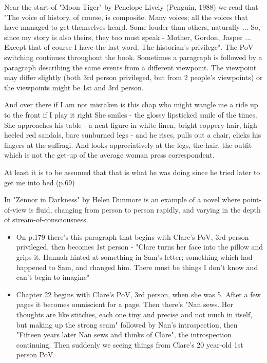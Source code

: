 \documentclass[11pt]{article}
\newenvironment{narrow}[2]{%
 \begin{list}{}{%
  \setlength{\topsep}{0pt}%
  \setlength{\leftmargin}{#1}%
  \setlength{\rightmargin}{#2}%
  \setlength{\listparindent}{\parindent}%
  \setlength{\itemindent}{\parindent}%
  \setlength{\parsep}{\parskip}%
 }%
\item[]}{\end{list}}
\begin{document}
Near the start of "Moon Tiger" by Penelope Lively (Penguin, 1988) we read that "The voice of history, of course, is composite. Many voices; all the voices that have managed to get themselves heard. Some louder than others, naturally ... So, since my story is also theirs, they too must speak - Mother, Gordon, Jasper ... Except that of course I have the last word. The historian's privilege". The PoV-switching continues throughout the book. Sometimes a paragraph is followed by a paragraph describing the same events from a different viewpoint. The viewpoint may differ slightly (both 3rd person privileged, but from 2 people's viewpoints) or the viewpoints might be 1st and 3rd person.
\begin{narrow}{1.0cm}{1.0cm}  
And over there if I am not mistaken is this chap who might wangle me a
 ride up to the front if I play it right She smiles - the glossy
 lipsticked smile of the times. She approaches his table - a neat
 figure in white linen, bright coppery hair, high-heeled red sandals,
 bare sunburned legs - and he rises, pulls out a chair, clicks his
 fingers at the suffragi.  And looks appreciatively at the legs, the
 hair, the outfit which is not the get-up of the average woman press
 correspondent.

At least it is to be assumed that that is what he was doing since he
 tried later to get me into bed
 (p.69)
\end{narrow}






In "Zennor in Darkness" by Helen Dunmore is an example of a novel where point-of-view is fluid, changing from person to person rapidly, and varying in the depth of stream-of-consciousness.


\begin{itemize}
\item On p.179 there's this paragraph that begins with Clare's PoV, 3rd-person privileged, then becomes 1st person - "Clare turns her face into the pillow and grips it. Hannah hinted at something in Sam's letter; something which had happened to Sam, and changed him. There must be things I don't know and can't begin to imagine"

\item Chapter 22 begins with Clare's PoV, 3rd person, when she was 5. After a few pages it becomes omniscient for a page. Then there's "Nan sews. Her thoughts are like stitches, each one tiny and precise and not much in itself, but making up the strong seam" followed by Nan's introspection, then "Fifteen years later Nan sews and thinks of Clare", the introspection continuing. Then suddenly we seeing things from Clare's 20 year-old 1st person PoV.

\end{itemize}
\end{document}
